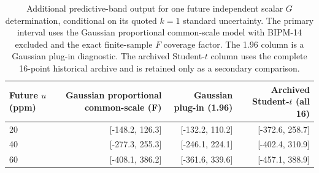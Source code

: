 \begin{table}[htbp]
\centering
\caption{Additional predictive-band output for one future independent scalar $G$ determination, conditional on its quoted $k=1$ standard uncertainty. The primary interval uses the Gaussian proportional common-scale model with BIPM-14 excluded and the exact finite-sample $F$ coverage factor. The 1.96 column is a Gaussian plug-in diagnostic. The archived Student-$t$ column uses the complete 16-point historical archive and is retained only as a secondary comparison.}
\label{tab:gaussian_predictive_band}
\small
\begin{tabular}{lrrr}
\toprule
Future $u$ (ppm) & Gaussian proportional common-scale (F) & Gaussian plug-in (1.96) & Archived Student-$t$ (all 16) \\
\midrule
20 & [-148.2, 126.3] & [-132.2, 110.2] & [-372.6, 258.7] \\
40 & [-277.3, 255.3] & [-246.1, 224.1] & [-402.4, 310.9] \\
60 & [-408.1, 386.2] & [-361.6, 339.6] & [-457.1, 388.9] \\
\bottomrule
\end{tabular}
\end{table}
